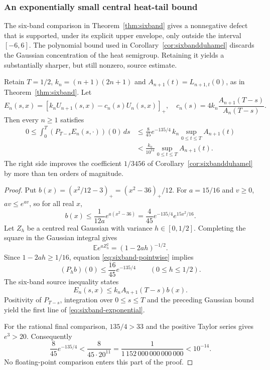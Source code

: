 \subsubsection{An exponentially small central heat-tail bound}
\label{subsec:sixband-exponential}
The six-band comparison in Theorem~\ref{thm:sixband}
gives a nonnegative defect that is supported, under its
explicit upper envelope, only outside the interval
$[-6,6]$. The polynomial bound used in
Corollary~\ref{cor:sixbandduhamel} discards
the Gaussian concentration of the heat semigroup.
Retaining it yields a substantially sharper,
but still nonzero, source estimate.

\begin{theorem}
\label{thm:sixband-exponential}
Retain $T=1/2$, $k_n=(n+1)(2n+1)$ and
$A_{n+1}(t)=L_{n+1,t}(0)$, as in
Theorem~\ref{thm:sixband}. Let
\[
E_n(s,x)=
[k_nU_{n+1}(s,x)-c_n(s)U_n(s,x)]_+,
\quad
c_n(s)=4k_n\frac{A_{n+1}(T-s)}{A_n(T-s)}.
\]
Then every $n\ge1$ satisfies
\begin{equation}\label{eq:sixband-exponential}
\boxed{
\begin{aligned}
0\le
\int_0^T(P_{T-s}E_n(s,\cdot))(0)\,ds
&\le \frac8{45}e^{-135/4}
\,k_n\sup_{0\le t\le T}A_{n+1}(t)\\
&<
\frac{k_n}{10^{14}}
\sup_{0\le t\le T}A_{n+1}(t).
\end{aligned}}
\end{equation}
The right side improves the coefficient $1/3456$
of Corollary~\ref{cor:sixbandduhamel} by
more than ten orders of magnitude.
\end{theorem}
\begin{proof}
Put $b(x)=(x^2/12-3)_+=(x^2-36)_+/12$.
For $a=15/16$ and $v\ge0$,
$av\le e^{av}$, so for all real $x$,
\begin{equation}\label{eq:sixband-pointwise}
b(x)\le
\frac1{12a}e^{a(x^2-36)}
=\frac4{45}e^{-135/4}e^{15x^2/16}.
\end{equation}
Let $Z_h$ be a centred real Gaussian
with variance $h\in[0,1/2]$.
Completing the square in the Gaussian
integral gives
\[
\mathbb E e^{aZ_h^2}=(1-2ah)^{-1/2}.
\]
Since $1-2ah\ge1/16$, equation
\eqref{eq:sixband-pointwise} implies
\begin{equation}
(P_hb)(0)\le
\frac{16}{45}e^{-135/4}
\qquad(0\le h\le1/2).
\end{equation}
The six-band source inequality states
\[
E_n(s,x)\le k_nA_{n+1}(T-s)b(x).
\]
Positivity of $P_{T-s}$, integration over
$0\le s\le T$ and the preceding Gaussian
bound yield the first line of
\eqref{eq:sixband-exponential}.

For the rational final comparison,
$135/4>33$ and the positive Taylor series
gives $e^3>20$. Consequently
\[
\frac8{45}e^{-135/4}
<
\frac8{45\cdot20^{11}}
=\frac1{1\,152\,000\,000\,000\,000}
<10^{-14}.
\]
No floating-point comparison enters
this part of the proof.
\end{proof}

